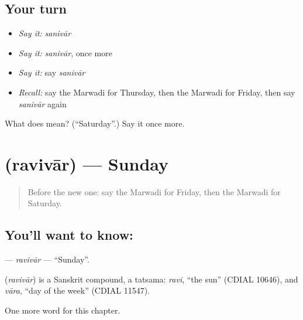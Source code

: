 \subsection*{Your turn}
\begin{itemize}
\raggedright
  \item \emph{Say it:} \emph{sanivār}
  \item \emph{Say it:} \emph{sanivār}, once more
  \item \emph{Say it:} say \emph{sanivār}
  \item \emph{Recall:} say the Marwadi for Thursday, then the Marwadi for Friday, then say \emph{sanivār} again
\end{itemize}

\begin{tcolorbox}[breakable,colback=teal!4,colframe=teal!35!black,title={Before you move on}]
What does  mean? (\textquotedblleft{}Saturday\textquotedblright{}.) Say it once more.
\end{tcolorbox}
\section[\texorpdfstring{\mw{रविवार} (ravivār)}{रविवार (ravivār)}]{ (ravivār) — Sunday}

\label{lesson:MW-C92-ravivar}



\begin{quote}
Before the new one: say the Marwadi for Friday, then the Marwadi for Saturday.
\end{quote}

\subsection*{You'll want to know: }
\textbf{} — \emph{ravivār} — \textquotedblleft{}Sunday\textquotedblright{}.

\begin{cousinweb}
\textbf{} (\emph{ravivār}) is a Sanskrit compound, a tatsama: \emph{ravi}, \textquotedblleft{}the sun\textquotedblright{} (CDIAL 10646), and \emph{vāra}, \textquotedblleft{}day of the week\textquotedblright{} (CDIAL 11547).
\end{cousinweb}

\begin{grammarlens}[title={What you've built}]
One more word for this chapter.
\end{grammarlens}

